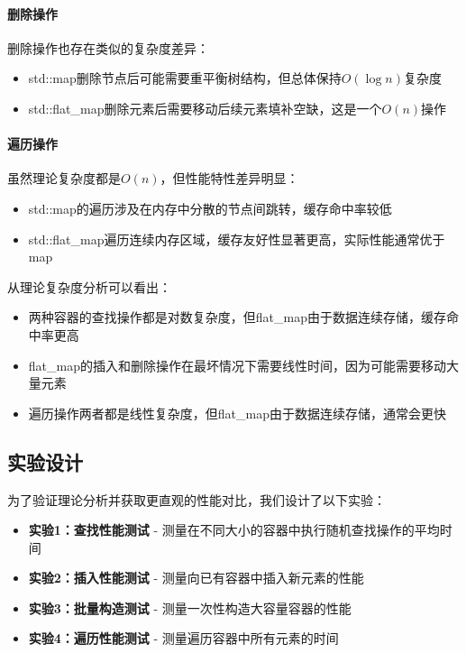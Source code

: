 \documentclass[a4paper, 12pt]{article}
\begin{document}
\paragraph{删除操作} 删除操作也存在类似的复杂度差异：
\begin{itemize}
    \setlength{\itemsep}{0pt}
    \setlength{\parsep}{0pt}
    \setlength{\parskip}{0pt}
    \item std::map删除节点后可能需要重平衡树结构，但总体保持$O(\log n)$复杂度
    \item std::flat\_map删除元素后需要移动后续元素填补空缺，这是一个$O(n)$操作
\end{itemize}

\paragraph{遍历操作} 虽然理论复杂度都是$O(n)$，但性能特性差异明显：
\begin{itemize}
    \setlength{\itemsep}{0pt}
    \setlength{\parsep}{0pt}
    \setlength{\parskip}{0pt}
    \item std::map的遍历涉及在内存中分散的节点间跳转，缓存命中率较低
    \item std::flat\_map遍历连续内存区域，缓存友好性显著更高，实际性能通常优于map
\end{itemize}

从理论复杂度分析可以看出：
\begin{itemize}
    \setlength{\itemsep}{0pt}
    \setlength{\parsep}{0pt}
    \setlength{\parskip}{0pt}
    \item 两种容器的查找操作都是对数复杂度，但flat\_map由于数据连续存储，缓存命中率更高
    \item flat\_map的插入和删除操作在最坏情况下需要线性时间，因为可能需要移动大量元素
    \item 遍历操作两者都是线性复杂度，但flat\_map由于数据连续存储，通常会更快
\end{itemize}

\subsection{实验设计}

为了验证理论分析并获取更直观的性能对比，我们设计了以下实验：

\begin{itemize}
    \setlength{\itemsep}{0pt}
    \setlength{\parsep}{0pt}
    \setlength{\parskip}{0pt}
    \item \textbf{实验1：查找性能测试} - 测量在不同大小的容器中执行随机查找操作的平均时间
    \item \textbf{实验2：插入性能测试} - 测量向已有容器中插入新元素的性能
    \item \textbf{实验3：批量构造测试} - 测量一次性构造大容量容器的性能
    \item \textbf{实验4：遍历性能测试} - 测量遍历容器中所有元素的时间
\end{itemize}
\end{document}
